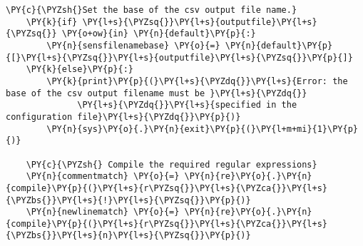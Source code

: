 \begin{Verbatim}[commandchars=\\\{\}]
    \PY{c}{\PYZsh{}Set the base of the csv output file name.}
    \PY{k}{if} \PY{l+s}{\PYZsq{}}\PY{l+s}{outputfile}\PY{l+s}{\PYZsq{}} \PY{o+ow}{in} \PY{n}{default}\PY{p}{:}
        \PY{n}{sensfilenamebase} \PY{o}{=} \PY{n}{default}\PY{p}{[}\PY{l+s}{\PYZsq{}}\PY{l+s}{outputfile}\PY{l+s}{\PYZsq{}}\PY{p}{]}
    \PY{k}{else}\PY{p}{:}
        \PY{k}{print}\PY{p}{(}\PY{l+s}{\PYZdq{}}\PY{l+s}{Error: the base of the csv output filename must be }\PY{l+s}{\PYZdq{}}
              \PY{l+s}{\PYZdq{}}\PY{l+s}{specified in the configuration file}\PY{l+s}{\PYZdq{}}\PY{p}{)}
        \PY{n}{sys}\PY{o}{.}\PY{n}{exit}\PY{p}{(}\PY{l+m+mi}{1}\PY{p}{)}

    \PY{c}{\PYZsh{} Compile the required regular expressions}
    \PY{n}{commentmatch} \PY{o}{=} \PY{n}{re}\PY{o}{.}\PY{n}{compile}\PY{p}{(}\PY{l+s}{r\PYZsq{}}\PY{l+s}{\PYZca{}}\PY{l+s}{\PYZbs{}}\PY{l+s}{!}\PY{l+s}{\PYZsq{}}\PY{p}{)}
    \PY{n}{newlinematch} \PY{o}{=} \PY{n}{re}\PY{o}{.}\PY{n}{compile}\PY{p}{(}\PY{l+s}{r\PYZsq{}}\PY{l+s}{\PYZca{}}\PY{l+s}{\PYZbs{}}\PY{l+s}{n}\PY{l+s}{\PYZsq{}}\PY{p}{)}


\end{Verbatim}
